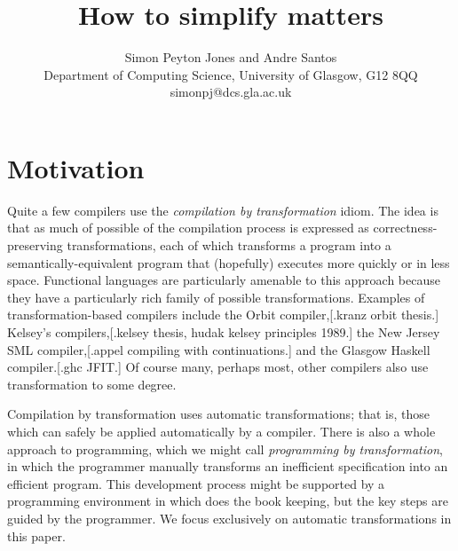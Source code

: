 \documentclass[11pt]{article}
\begin{document}
\title{How to simplify matters}

\author{Simon Peyton Jones and Andre Santos\\ 
Department of Computing Science, University of Glasgow, G12 8QQ \\
	simonpj@dcs.gla.ac.uk
}

\maketitle


\section{Motivation}

Quite a few compilers use the {\em compilation by transformation} idiom.
The idea is that as much of possible of the compilation process is
expressed as correctness-preserving transformations, each of which
transforms a program into a semantically-equivalent
program that (hopefully) executes more quickly or in less space.
Functional languages are particularly amenable to this approach because
they have a particularly rich family of possible transformations.
Examples of transformation-based compilers
include the Orbit compiler,[.kranz orbit thesis.]
Kelsey's compilers,[.kelsey thesis, hudak kelsey principles 1989.]
the New Jersey SML compiler,[.appel compiling with continuations.]
and the Glasgow Haskell compiler.[.ghc JFIT.]  Of course many, perhaps most, 
other compilers also use transformation to some degree.

Compilation by transformation uses automatic transformations; that is, those
which can safely be applied automatically by a compiler. There
is also a whole approach to programming, which we might call {\em programming by transformation},
in which the programmer manually transforms an inefficient specification into
an efficient program. This development process might be supported by
a programming environment in which does the book keeping, but the key steps
are guided by the programmer.  We focus exclusively on automatic transformations
in this paper.
\end{document}
